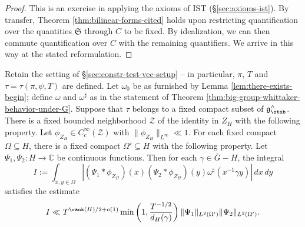 \begin{proof}
  This is an exercise in applying the axioms of IST (\S\ref{sec:axioms-ist}).  By transfer, Theorem \ref{thm:bilinear-forms-cited} holds upon restricting quantification over the quantities $\mathfrak{S}$ through $C$ to be fixed.  By idealization, we can then commute quantification over $C$ with the remaining quantifiers.  We arrive in this way at the stated reformulation.
\end{proof}

\begin{proposition}\label{prop:standard2:let-tau-belong}
  Retain the setting of \S\ref{sec:constr-test-vec-setup} -- in particular, $\pi$, $T$ and $\tau = \tau(\pi,\psi,T)$ are defined.  Let $\omega_0$ be as furnished by Lemma \ref{lem:there-exists-begin}; define $\omega$ and $\omega^\sharp$ as in the statement of Theorem \ref{thm:big-group-whittaker-behavior-under-G}.  Suppose that $\tau$ belongs to a fixed compact subset of $\mathfrak{g}^\wedge_{\stab}$.  There is a fixed bounded neighborhood $\mathcal{Z}$ of the identity in $Z_H$ with the following property.  Let $\phi_{Z_H} \in C_c^\infty(\mathcal{Z})$ with $\|\phi_{Z_H}\|_{L^\infty} \ll 1$.  For each fixed compact $\Omega \subseteq H$, there is a fixed compact $\Omega ' \subseteq H$ with the following property.  Let $\Psi_1, \Psi_2 : H \rightarrow \mathbb{C}$ be continuous functions.  Then for each $\gamma \in \bar{G} - H$, the integral
  \begin{equation*}
    I := \int_{x, y \in \Omega }
    \left\lvert
      (\Psi_1 \ast \phi_{Z_H})(x)
      (\Psi_2 \ast \phi_{Z_H})(y)
      \omega^\sharp(x^{-1} \gamma y)
    \right\rvert
    \, d x \, d y
  \end{equation*}
  satisfies the estimate
  \begin{equation*}
    I \ll
    T^{\rank(H)/2 + o(1)}
    \min\left( 1,
      \frac{T^{-1/2}}{ d_H(\gamma)}
    \right)
    \|\Psi_1\|_{L^2(\Omega')}
    \|\Psi_2\|_{L^2(\Omega')}.
  \end{equation*}
\end{proposition}
